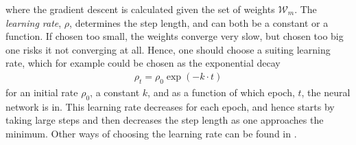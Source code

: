 where the gradient descent is calculated given the set of weights $\mathcal{W}_m$. The \emph{learning rate}, $\rho$, determines the step length, and can both be a constant or a function. If chosen too small, the weights converge very slow, but chosen too big one risks it not converging at all. Hence, one should choose a suiting learning rate, which for example could be chosen as the exponential decay
\begin{align*}
    \rho_t = \rho_0 \exp{(-k \cdot t)}
\end{align*}
for an initial rate $\rho_0$, a constant $k$, and as a function of which epoch, $t$, the neural network is in. This learning rate decreases for each epoch, and hence starts by taking large steps and then decreases the step length as one approaches the minimum. Other ways of choosing the learning rate can be found in \citep[p. 135-141]{NNDL}.

